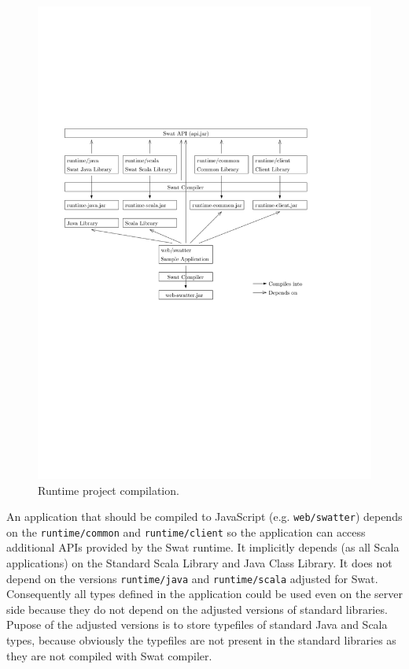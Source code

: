 \documentclass[12pt,a4paper]{report}
\begin{document}
\begin{figure}[ht]
  \centering
	\includegraphics[width=\linewidth,height=\textheight,keepaspectratio]{img/Project.pdf}
	\caption{Runtime project compilation.}
	\label{Project}
\end{figure}

An application that should be compiled to JavaScript (e.g. \texttt{web/swatter}) depends on the \texttt{runtime/common} and \texttt{runtime/client} so the application can access additional APIs provided by the Swat runtime. It implicitly depends (as all Scala applications) on the Standard Scala Library and Java Class Library. It does not depend on the versions \texttt{runtime/java} and \texttt{runtime/scala} adjusted for Swat. Consequently all types defined in the application could be used even on the server side because they do not depend on the adjusted versions of standard libraries. Pupose of the adjusted versions is to store typefiles of standard Java and Scala types, because obviously the typefiles are not present in the standard libraries as they are not compiled with Swat compiler.
\end{document}
